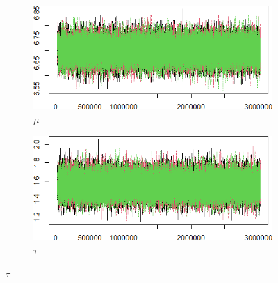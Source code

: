 \documentclass{Class/julia}
\begin{document}
\begin{figure}[!ht]
    \centering
    \caption{Trace Plots After Thinning}
    \label{fig:20}
    \begin{subfigure}{0.45\textwidth}
        \centering
        \includegraphics[width=\textwidth]{itamtplcost_nb/trace_after_thinning_mu.png}
        \caption{\( \mu \)}
    \end{subfigure}
    \hfill
    \begin{subfigure}{0.45\textwidth}
        \centering
        \includegraphics[width=\textwidth]{itamtplcost_nb/trace_after_thinning_tau.png}
        \caption{\( \tau \)}
    \end{subfigure}

    \vspace{1em}


\end{figure}
\end{document}
